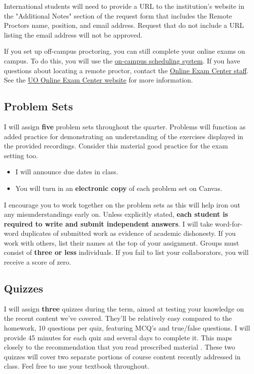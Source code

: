\documentclass[10pt]{article}
\begin{document}
\bigskip

\noindent International students will need to provide a URL to the institution's website in the "Additional Notes" section of the request form that includes the Remote Proctors name, position, and email address. Request that do not include a URL listing the email address will not be approved. 

\bigskip

\noindent If you set up off-campus proctoring, you can still complete your online exams on campus. To do this, you will use the \href{https://online.uoregon.edu/campus-proctoring}{on-campus scheduling system}. 
If you have questions about locating a remote proctor, contact the \href{https://online.uoregon.edu/examcenter#contact}{Online Exam Center staff}. 
See the \href{https://online.uoregon.edu/examcenter}{UO Online Exam Center website} for more information. 

\subsection*{Problem Sets} 

I will assign \textbf{five} problem sets throughout the quarter. Problems will function as added practice for demonstrating an understanding of the exercises displayed in the provided recordings. Consider this material good practice for the exam setting too.
\begin{itemize}
	\setlength{\itemsep}{0pt}
	\item I will announce due dates in class. 
	\item You will turn in an \textbf{electronic copy} of each problem set on Canvas.
\end{itemize}
I encourage you to work together on the problem sets as this will help iron out any misunderstandings early on. 
Unless explicitly stated, \textbf{each student is required to write and submit independent answers}. 
I will take word-for-word duplicates of submitted work as evidence of academic dishonesty. 
If you work with others, list their names at the top of your assignment. Groups must consist of {\bf three or less} individuals. 
If you fail to list your collaborators, you will receive a score of zero.

\subsection*{Quizzes}

I will assign \textbf{three} quizzes during the term, aimed at testing your knowledge on the recent content we've covered.
They'll be relatively easy compared to the homework, 10 questions per quiz, featuring MCQ's and true/false questions. 
I will provide 45 minutes for each quiz and several days to complete it. 
This maps closely to the recommendation that you read prescribed material . 
These two quizzes will cover two separate portions of course content recently addressed in class.
Feel free to use your textbook throughout.
\end{document}
